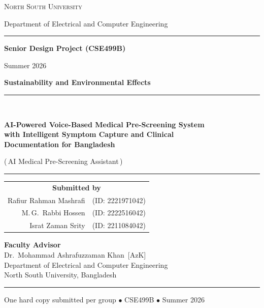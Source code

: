\documentclass[11pt,a4paper]{article}
\begin{document}
\begin{titlepage}
\centering
\vspace*{0.5cm}

{\large\scshape North South University\par}
{\normalsize Department of Electrical and Computer Engineering\par}
\vspace{0.3cm}
\rule{\textwidth}{0.4pt}

\vspace{1.7cm}
{\Large\bfseries Senior Design Project (CSE499B)\par}
\vspace{0.4cm}
{\normalsize Summer 2026\par}

\vspace{2.0cm}
{\LARGE\bfseries Sustainability and Environmental Effects\par}

\vspace{1.8cm}
\rule{0.7\textwidth}{0.6pt}\\[0.8cm]
{\large\bfseries AI-Powered Voice-Based Medical Pre-Screening System\\
with Intelligent Symptom Capture and Clinical\\
Documentation for Bangladesh\par}
\vspace{0.3cm}
{\normalsize (\,AI Medical Pre-Screening Assistant\,)\par}
\rule{0.7\textwidth}{0.6pt}

\vspace{1.9cm}
\begin{tabular}{rl}
\multicolumn{2}{c}{\bfseries Submitted by}\\[4pt]
Rafiur Rahman Mashrafi & (ID: 2221971042)\\
M.\,G.\ Rabbi Hossen     & (ID: 2222516042)\\
Israt Zaman Srity        & (ID: 2211084042)\\
\end{tabular}

\vspace{1.3cm}
{\bfseries Faculty Advisor}\\[3pt]
Dr.\ Mohammad Ashrafuzzaman Khan\ [AzK]\\
Department of Electrical and Computer Engineering\\
North South University, Bangladesh

\vfill
\rule{\textwidth}{0.4pt}
{\footnotesize One hard copy submitted per group $\bullet$ CSE499B $\bullet$ Summer 2026\par}
\end{titlepage}
\end{document}
